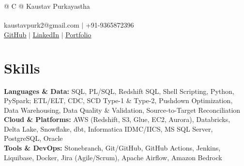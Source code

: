 \documentclass[a4paper,8pt]{article}
\begin{document}
\pagestyle{empty}

\begin{tabularx}{\linewidth}{@{} C @{}}
\color[HTML]{1C033C} \Huge{Kaustav Purkayastha} \\[6pt]
\\
\textcolor[HTML]{371e77}{{\faEnvelope} kaustavpurk2@gmail.com $|$ {\faMobile} +91-9365872396} \\[3pt]
\textcolor[HTML]{371e77}{\href{https://github.com/Kaustav-Purkayastha}{\uline{{\raisebox{-0.05\height}{\faGithub}} GitHub}} $|$
\href{https://linkedin.com/in/kaustav-02}{\uline{{\raisebox{-0.05\height}{\faLinkedin}} LinkedIn}} $|$
\href{https://Kaustav-Purkayastha.github.io/portfolio/}{\uline{{\raisebox{-0.05\height}{\faGlobe}} Portfolio}}}
\end{tabularx}

\section{Skills}
\color[HTML]{1C033C}\textbf{Languages \& Data:} SQL, PL/SQL, Redshift SQL, Shell Scripting, Python, PySpark; ETL/ELT, CDC, SCD Type-1 \& Type-2, Pushdown Optimization, Data Warehousing, Data Quality \& Validation, Source-to-Target Reconciliation\\[3pt]
\color[HTML]{1C033C}\textbf{Cloud \& Platforms:} AWS (Redshift, S3, Glue, EC2, Aurora), Databricks, Delta Lake, Snowflake, dbt, Informatica IDMC/IICS, MS SQL Server, PostgreSQL, Oracle\\[3pt]
\color[HTML]{1C033C}\textbf{Tools \& DevOps:} Stonebranch, Git/GitHub, GitHub Actions, Jenkins, Liquibase, Docker, Jira (Agile/Scrum), Apache Airflow, Amazon Bedrock

\end{document}
